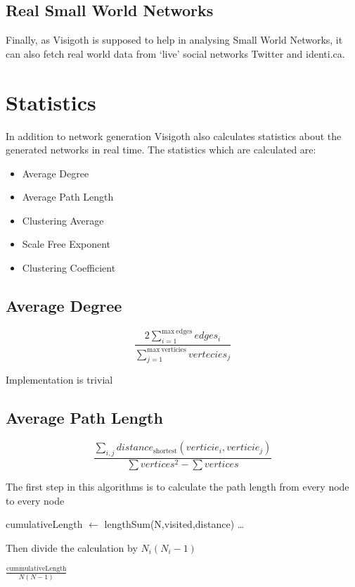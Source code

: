 \documentclass[a4paper,11pt,titlepage]{article}
\let\stdsection\section         %
\renewcommand{\section}{\newpage\stdsection}
\begin{document}
\subsection{Real Small World Networks}
Finally, as Visigoth is supposed to help in analysing Small World
Networks, it can also fetch real world data from `live' social
networks Twitter and identi.ca.

\section{Statistics}


In addition to network generation Visigoth also calculates statistics about the
generated networks in real time. The statistics which are calculated are:


\begin{itemize}
	\item Average Degree
	\item Average Path Length
	\item Clustering Average
	\item Scale Free Exponent
	\item Clustering Coefficient
\end{itemize}

\subsection{Average Degree}
\[
\frac{2\sum_{i=1}^{\mathrm{max\ edges}} edges_i}{\sum_{j=1}^{\mathrm{max\
verticies}} vertecies_j}
\]

Implementation is trivial

\subsection{Average Path Length}
\[
\frac{\sum_{i,j}distance_\mathrm{shortest}(verticie_i,verticie_j)}{\sum
vertices^2 - \sum vertices}
\]

The first step in this algorithms is to calculate the path length from every
node to every node

\begin{algorithmic}
	\STATE cumulativeLength $\gets$ lengthSum(N,visited,distance)
	\STATE \dots
\ENDFOR
\end{algorithmic}
Then divide the calculation by $N_i(N_i-1)$
\begin{algorithmic}
	\RETURN  $\frac{\mathrm{cummulativeLength}}{N(N-1)}$
\end{algorithmic}
\end{document}
